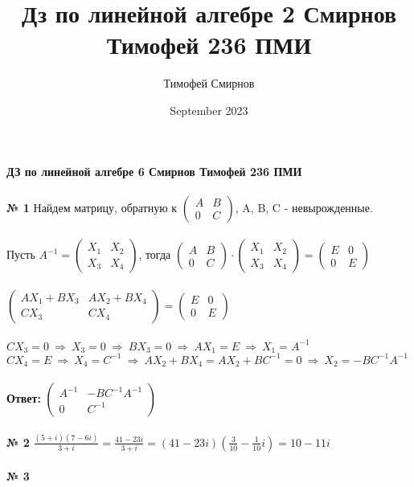 \documentclass[a4paper, 12pt]{article}
\title{Дз по линейной алгебре 2 Смирнов Тимофей 236 ПМИ}
\author{Тимофей Смирнов}
\date{September 2023}
\begin{document}
    {\center \bf \large ДЗ по линейной алгебре 6 Смирнов Тимофей 236 ПМИ}
    \\
    \\ \textbf{№ 1} Найдем матрицу, обратную к $\begin{pmatrix}A & B \\ 0 & C\end{pmatrix}$, A, B, C - невырожденные.
    \\
    \\ Пусть $A^{-1} = \begin{pmatrix}X_1 & X_2 \\ X_3 & X_4\end{pmatrix}$, тогда $\begin{pmatrix}A & B \\ 0 & C\end{pmatrix} \cdot \begin{pmatrix}X_1 & X_2 \\ X_3 & X_4\end{pmatrix} = \begin{pmatrix}E & 0 \\ 0 & E\end{pmatrix}$
    \\
    \\ $\begin{pmatrix}AX_1 + BX_3 & AX_2 + BX_4 \\ CX_3 & CX_4\end{pmatrix} = \begin{pmatrix}E & 0 \\ 0 & E\end{pmatrix}$
    \\
    \\ $CX_3 = 0 \ \Rightarrow \ X_3 = 0 \ \Rightarrow \ BX_3 = 0 \ \Rightarrow \ AX_1 = E \ \Rightarrow \ X_1 = A^{-1}$
    \\ $CX_4 = E \ \Rightarrow \ X_4 = C^{-1} \ \Rightarrow \ AX_2 + BX_4 = AX_2 + BC^{-1} = 0 \ \Rightarrow \ X_2 = -BC^{-1}A^{-1}$
    \\
    \\ \textbf{Ответ: } $\begin{pmatrix}A^{-1} & -BC^{-1}A^{-1} \\ 0 & C^{-1}\end{pmatrix}$
    \\
    \\ \textbf{№ 2} $\frac{(5 + i)(7 - 6i)}{3 + i} = \frac{41 - 23i}{3 + i} = (41 - 23i)(\frac{3}{10} - \frac{1}{10}i) = 10 - 11 i$
    \\
    \\ \textbf{№ 3}
\end{document}
